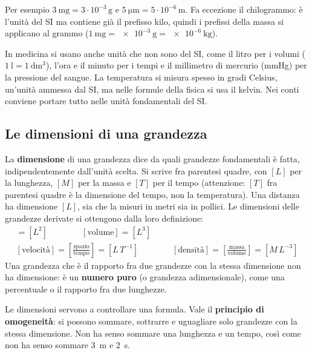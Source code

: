 Per esempio $\SI{3}{\milli\gram} = 3 \cdot 10^{-3}\,\si{\gram}$ e $\SI{5}{\micro\metre} = 5 \cdot 10^{-6}\,\si{\metre}$. Fa eccezione il chilogrammo: è l'unità del SI ma contiene già il prefisso kilo, quindi i prefissi della massa si applicano al grammo ($\SI{1}{\milli\gram} = \SI{e-3}{\gram} = \SI{e-6}{\kilo\gram}$).

In medicina si usano anche unità che non sono del SI, come il litro per i volumi ($\SI{1}{\litre} = \SI{1}{\deci\metre\cubed}$), l'ora e il minuto per i tempi e il millimetro di mercurio (mmHg) per la pressione del sangue. La temperatura si misura spesso in gradi Celsius, un'unità ammessa dal SI, ma nelle formule della fisica si usa il kelvin. Nei conti conviene portare tutto nelle unità fondamentali del SI.

\subsection{Le dimensioni di una grandezza}

La \textbf{dimensione} di una grandezza dice da quali grandezze fondamentali è fatta, indipendentemente dall'unità scelta. Si scrive fra parentesi quadre, con $[L]$ per la lunghezza, $[M]$ per la massa e $[T]$ per il tempo (attenzione: $[T]$ fra parentesi quadre è la dimensione del tempo, non la temperatura). Una distanza ha dimensione $[L]$, sia che la misuri in metri sia in pollici. Le dimensioni delle grandezze derivate si ottengono dalla loro definizione:
\begin{gather*}
  [\text{area}] = [L^{2}] \qquad\qquad
  [\text{volume}] = [L^{3}]
  \\
  [\text{velocità}] = \left[\frac{\text{spazio}}{\text{tempo}}\right] = [L\,T^{-1}] \qquad\qquad
  [\text{densità}] = \left[\frac{\text{massa}}{\text{volume}}\right] = [M\,L^{-3}]
\end{gather*}
Una grandezza che è il rapporto fra due grandezze con la stessa dimensione non ha dimensione: è un \textbf{numero puro} (o grandezza adimensionale), come una percentuale o il rapporto fra due lunghezze.

Le dimensioni servono a controllare una formula. Vale il \textbf{principio di omogeneità}: si possono sommare, sottrarre e uguagliare solo grandezze con la stessa dimensione. Non ha senso sommare una lunghezza e un tempo, così come non ha senso sommare \SI{3}{\metre} e \SI{2}{\second}.

